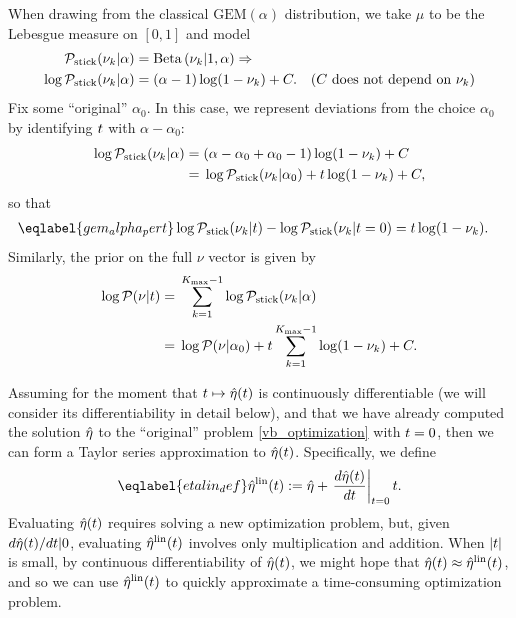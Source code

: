 \begin{ex}
%
When drawing from the classical $\mathrm{GEM}(\alpha)$ distribution, we take
$\mu$ to be the Lebesgue measure on $[0,1]$ and model
%
\begin{align*}
%
\pstick(\nuk \vert \alpha) ={}&
    \betadist{\nuk \vert 1, \alpha} \Rightarrow\\
\log \pstick(\nuk \vert \alpha) ={}&
    (\alpha - 1) \log(1 - \nuk) + \const. &
    \constdesc{\nuk}
%
\end{align*}
%
Fix some ``original'' $\alpha_0$.  In this case, we represent deviations from
the choice $\alpha_0$ by identifying $t$ with $\alpha - \alpha_0$:
%
\begin{align*}
%
\log \pstick(\nuk \vert \alpha) ={}&
    (\alpha - \alpha_0 + \alpha_0 - 1) \log(1 - \nuk) + \const \\
%
 ={}&
    \log \pstick(\nuk \vert \alpha_0) +
    \t \log(1 - \nuk) + \const,
\end{align*}
%
so that
%
\begin{align}\eqlabel{gem_alpha_pert}
%
\log \pstick(\nuk \vert \t) - \log \pstick(\nuk \vert \t=0) ={}&
    \t \log(1 - \nuk).
%
\end{align}
%
Similarly, the prior on the full $\nu$ vector is given by
%
\begin{align*}
%
\log \p(\nu \vert \t) ={}&
    \sumkm \log \pstick(\nuk \vert \alpha)
\\={}&
    \log \p(\nu \vert \alpha_0) + \t \sumkm \log(1 - \nuk) + \const.
%
\end{align*}
%
\end{ex}

Assuming for the moment that $t \mapsto \hat\eta(t)$ is continuously
differentiable (we will consider its differentiability in detail below), and
that we have already computed the solution $\hat\eta$ to the ``original'' problem
\eqref{vb_optimization} with $t=0$, then we can form a Taylor series
approximation to $\hat\eta(t)$.  Specifically, we define
%
\begin{align}\eqlabel{etalin_def}
%
\etalin(\t) := \etaopt + \fracat{d \etaopt(\t)}{d \t}{\t=0} \t .
%
\end{align}
%
Evaluating $\hat\eta(t)$ requires solving a new optimization problem, but, given
$d\hat\eta(t) / dt | 0$, evaluating $\hat\eta^{\mathrm{lin}}(t)$ involves only
multiplication and addition.  When $|t|$ is small, by continuous
differentiability of $\hat\eta(t)$, we might hope that $\hat\eta(t) \approx
\hat\eta^{\mathrm{lin}}(t)$, and so we can use $\hat\eta^{\mathrm{lin}}(t)$ to quickly approximate a
time-consuming optimization problem.

